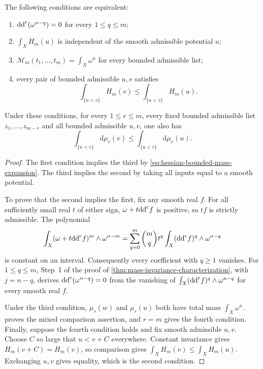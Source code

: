 \begin{theorem}\label{hessian:global-comparison-characterization}
The following conditions are equivalent:
\begin{enumerate}
\item $\mathrm{dd}^{\mathrm{c}}(\omega^{n-q})=0$ for every $1\leq q\leq m$;
\item $\int_XH_m(u)$ is independent of the smooth admissible
      potential $u$;
\item $\mathcal M_m(t_1,\ldots,t_m)=\int_X\omega^n$ for every
      bounded admissible list;
\item every pair of bounded admissible $u,v$ satisfies
\[
 \int_{\{u<v\}}H_m(v)\leq\int_{\{u<v\}}H_m(u).
\]
\end{enumerate}
Under these conditions, for every $1\leq r\leq m$, every fixed bounded
admissible list $z_1,\ldots,z_{m-r}$ and all bounded admissible $u,v$,
one also has
\[
 \int_{\{u<v\}}\mathrm d\mu_r(v)
           \leq\int_{\{u<v\}}\mathrm d\mu_r(u).
\]
\end{theorem}
\begin{proof}
The first condition implies the third by
\eqref{eq:hessian-bounded-mass-expansion}. The third implies the
second by taking all inputs equal to a smooth potential.

To prove that the second implies the first, fix any smooth real
$f$. For all sufficiently small real $t$ of either sign,
$\omega+t\mathrm{dd}^{\mathrm{c}} f$ is positive, so $tf$ is strictly admissible.
The polynomial
\[
 \int_X(\omega+t\mathrm{dd}^{\mathrm{c}} f)^m\wedge\omega^{n-m}
 =\sum_{q=0}^m\binom mq t^q
              \int_X(\mathrm{dd}^{\mathrm{c}} f)^q\wedge\omega^{n-q}
\]
is constant on an interval. Consequently every coefficient with
$q\geq1$ vanishes. For $1\leq q\leq m$, Step~1 of the proof of
\cref{thm:mass-invariance-characterization}, with $j=n-q$, derives
$\mathrm{dd}^{\mathrm{c}}(\omega^{n-q})=0$ from the vanishing of
$\int_X(\mathrm{dd}^{\mathrm{c}} f)^q\wedge\omega^{n-q}$ for every smooth real $f$.

Under the third condition, $\mu_r(w)$ and $\mu_r(u)$ both have
total mass $\int_X\omega^n$.  proves the mixed
comparison assertion, and $r=m$ gives the fourth condition.
Finally, suppose the fourth condition holds and fix smooth admissible
$u,v$. Choose $C$ so large that $u<v+C$ everywhere.
Constant invariance gives $H_m(v+C)=H_m(v)$, so comparison gives
$\int_XH_m(v)\leq\int_XH_m(u)$. Exchanging $u,v$ gives equality,
which is the second condition.
\end{proof}

